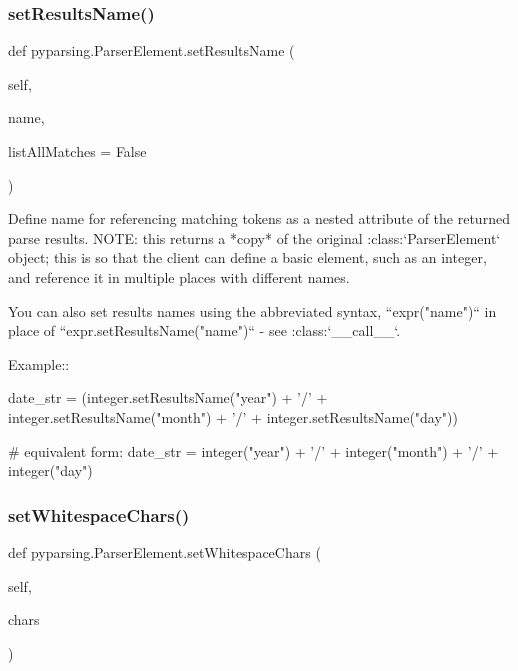 \subsubsection{\texorpdfstring{set\+Results\+Name()}{setResultsName()}}
{\footnotesize\ttfamily def pyparsing.\+Parser\+Element.\+set\+Results\+Name (\begin{DoxyParamCaption}\item[{}]{self,  }\item[{}]{name,  }\item[{}]{list\+All\+Matches = {\ttfamily False} }\end{DoxyParamCaption})}

\begin{DoxyVerb}Define name for referencing matching tokens as a nested attribute
of the returned parse results.
NOTE: this returns a *copy* of the original :class:`ParserElement` object;
this is so that the client can define a basic element, such as an
integer, and reference it in multiple places with different names.

You can also set results names using the abbreviated syntax,
``expr("name")`` in place of ``expr.setResultsName("name")``
- see :class:`__call__`.

Example::

    date_str = (integer.setResultsName("year") + '/'
        + integer.setResultsName("month") + '/'
        + integer.setResultsName("day"))

    # equivalent form:
    date_str = integer("year") + '/' + integer("month") + '/' + integer("day")
\end{DoxyVerb}
 \mbox{\label{classpyparsing_1_1ParserElement_a02335ae8eec55cf3944fd79769a4104e}} 
\subsubsection{\texorpdfstring{set\+Whitespace\+Chars()}{setWhitespaceChars()}}
{\footnotesize\ttfamily def pyparsing.\+Parser\+Element.\+set\+Whitespace\+Chars (\begin{DoxyParamCaption}\item[{}]{self,  }\item[{}]{chars }\end{DoxyParamCaption})}


